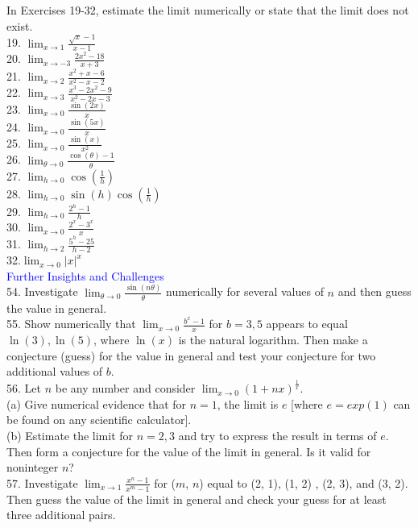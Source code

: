 \documentclass{article}
\begin{document}
In Exercises 19-32, estimate the limit numerically or state that the limit does not exist.\\
19. $\lim_{x \to 1}\frac{\sqrt{x} - 1}{x - 1}$\\
20. $\lim_{x \to -3}\frac{2x^2 - 18}{x + 3}$\\
21. $\lim_{x \to 2}\frac{x^2 + x - 6}{x^2 - x - 2}$\\
22. $\lim_{x \to 3}\frac{x^3 - 2x^2 - 9}{x^2 - 2x - 3}$\\ 
23. $\lim_{x \to 0}\frac{\sin(2x)}{x}$\\
24. $\lim_{x \to 0}\frac{\sin(5x)}{x}$\\
25. $\lim_{x \to 0}\frac{\sin(x)}{x^2}$\\
26. $\lim_{\theta \to 0}\frac{\cos(\theta) - 1}{\theta}$\\
27. $\lim_{h \to 0}\cos(\frac{1}{h})$\\
28. $\lim_{h \to 0}\sin(h)\cos(\frac{1}{h})$\\
29. $\lim_{h \to 0}\frac{2^h - 1}{h}$\\
30. $\lim_{x \to 0}\frac{2^x - 3^x}{x}$\\
31. $\lim_{h \to 2}\frac{5^h - 25}{h - 2}$\\
32.$\lim_{x \to 0}\left|x\right|^x$\\

\textcolor{blue}{Further Insights and Challenges}\\
54. Investigate $\lim_{\theta \to 0}\frac{\sin(n\theta)}{\theta}$ numerically for several values of $n$ and then guess the value in general.\\

55. Show numerically that $\lim_{x \to 0}\frac{b^x - 1}{x}$ for $b = 3, 5$ appears to equal $\ln(3), \ln(5)$, where $\ln(x)$ is the natural logarithm. Then make a conjecture (guess) for the value in general and test your conjecture for two additional values of $b$.\\

56. Let $n$ be any number and consider $\lim_{x \to 0}(1 + nx)^{\frac{1}{x}}$.\\
(a) Give numerical evidence that for $n = 1$, the limit is $e$ [where $e = exp(1)$ can be found on any scientific calculator].\\
(b) Estimate the limit for $n = 2, 3$ and try to express the result in terms of $e$. Then form a conjecture for the value of the limit in general. Is it valid for noninteger $n$?\\

57. Investigate $\lim_{x \to 1}\frac{x^n - 1}{x^m - 1}$ for ($m$, $n$) equal to (2, 1), (1, 2) , (2, 3),  and (3, 2). Then guess the value of the limit in general and check your guess for at least three additional pairs.\\
\end{document}
